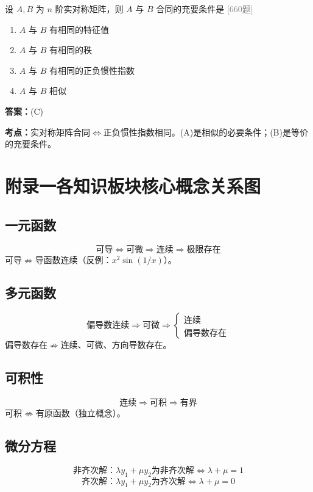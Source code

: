 \documentclass[12pt,a4paper]{ctexbook}
\newcommand{\src}[1]{\hfill\textcolor{gray}{\small\textsf{[#1]}}}
\newcommand{\ans}[1]{\begin{answerbox}\textbf{答案：}#1\end{answerbox}}
\newcommand{\kpt}[1]{\textbf{考点：}#1}
\begin{document}
\bigskip

\begin{exercise}[660题·合同与相似]
设 $A,B$ 为 $n$ 阶实对称矩阵，则 $A$ 与 $B$ 合同的充要条件是 \hfill\src{660题}
\begin{enumerate}[label=(\Alph*),nosep]
  \item $A$ 与 $B$ 有相同的特征值
  \item $A$ 与 $B$ 有相同的秩
  \item $A$ 与 $B$ 有相同的正负惯性指数
  \item $A$ 与 $B$ 相似
\end{enumerate}
\end{exercise}
\ans{(C)}
\kpt{实对称矩阵合同$\iff$正负惯性指数相同。(A)是相似的必要条件；(B)是等价的充要条件。}

\newpage

\chapter*{附录一\quad 各知识板块核心概念关系图}

\section*{一元函数}
\[
\text{可导} \iff \text{可微} \Longrightarrow \text{连续} \Longrightarrow \text{极限存在}
\]
可导$\not\Rightarrow$导函数连续（反例：$x^2\sin(1/x)$）。

\section*{多元函数}
\[
\text{偏导数连续} \Longrightarrow \text{可微} \Longrightarrow \begin{cases}\text{连续}\\ \text{偏导数存在}\end{cases}
\]
偏导数存在$\not\Rightarrow$连续、可微、方向导数存在。

\section*{可积性}
\[
\text{连续} \Longrightarrow \text{可积} \Longrightarrow \text{有界}
\]
可积$\not\iff$有原函数（独立概念）。

\section*{微分方程}
\[
\text{非齐次解：}\lambda y_1+\mu y_2\text{为非齐次解}\iff\lambda+\mu=1
\]
\[
\text{齐次解：}\lambda y_1+\mu y_2\text{为齐次解}\iff\lambda+\mu=0
\]
\end{document}
